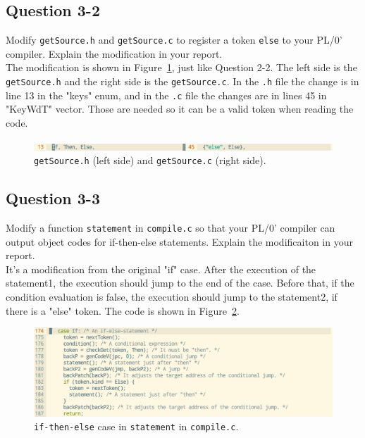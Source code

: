 \documentclass{article}
\begin{document}
\subsection*{Question 3-2}
Modify {\tt getSource.h} and {\tt getSource.c} to register a token
{\tt else} to your PL/0' compiler.
Explain the modification in your report.\\[0.3cm]


\ifreport
The modification is shown in Figure~\ref{fig:q32}, just like Question 2-2. The left side is the {\tt getSource.h} and the right side is the {\tt getSource.c}. In the {\tt .h} file the change is in line 13 in the "keys" enum, and in the {\tt .c} file the changes are in lines 45 in "KeyWdT" vector. Those are needed so it can be a valid token when reading the code.\\
\begin{figure}[h]
  \includegraphics[scale=0.35]{./img/Q3-2.png}
  \centering
  \caption{{\tt getSource.h} (left side) and {\tt getSource.c} (right side).}
  \label{fig:q32}
\end{figure}
\fi


\subsection*{Question 3-3}
Modify a function {\tt statement} in {\tt compile.c}
so that your PL/0' compiler can output object codes for if-then-else statements.
Explain the modificaiton in your report.\\[0.3cm]


\ifreport
It's a modification from the original "if" case. After the execution of the statement1, the execution should jump to the end of the case. Before that, if the condition evaluation is false, the execution should jump to the statement2, if there is a "else" token. The code is shown in Figure~\ref{fig:q33}. \\
\begin{figure}[h]
  \includegraphics[scale=0.35]{./img/Q3-3.png}
  \centering
  \caption{{\tt if-then-else} case in {\tt statement} in {\tt compile.c}.}
  \label{fig:q33}
\end{figure}
\fi
\end{document}
